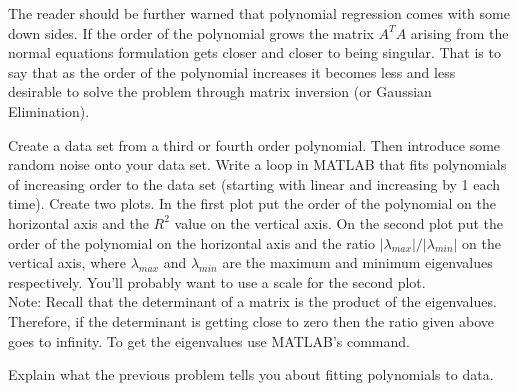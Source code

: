The reader should be further warned that polynomial regression comes with some down sides.
If the order of the polynomial grows the matrix $A^TA$ arising from the normal equations
formulation gets closer and closer to being singular.  That is to say that as the order of
the polynomial increases it becomes less and less desirable to solve the problem through
matrix inversion (or Gaussian Elimination).  

\begin{problem}
    Create a data set from a third or fourth order polynomial.  Then introduce some random
    noise onto your data set.  Write a loop in MATLAB that fits polynomials of increasing
    order to the data set (starting with linear and increasing by 1 each time).  Create
    two plots.  In the first plot put the order of the polynomial on the horizontal axis
    and the $R^2$ value on the vertical axis.  On the second plot put the order of the
    polynomial on the horizontal axis and the ratio $\left| \lambda_{max} \right| / \left| \lambda_{min}
    \right|$ on the vertical axis, where $\lambda_{max}$ and $\lambda_{min}$ are the
    maximum and minimum eigenvalues respectively.  You'll probably want to use a  scale
    for the second plot.  \\
    Note: Recall that the determinant of a matrix is the product of the eigenvalues.
    Therefore, if the determinant is getting close to zero then the ratio given above goes
    to infinity.  To get the eigenvalues use MATLAB's  command.
\end{problem}

\begin{problem}
    Explain what the previous problem tells you about fitting polynomials to data.
\end{problem}

